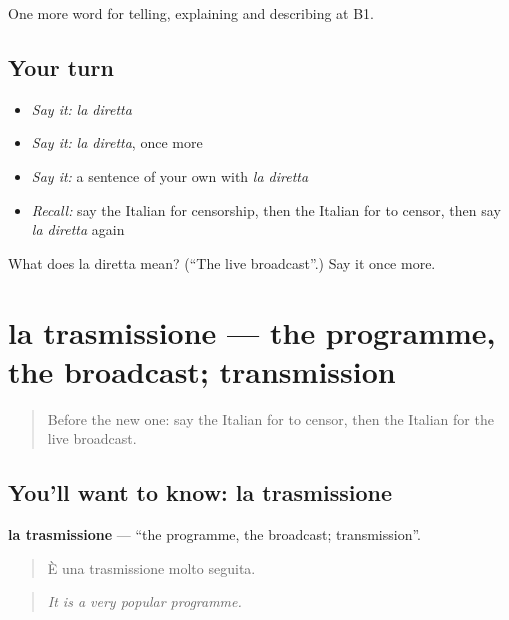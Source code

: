 \begin{grammarlens}[title={What you've built}]
One more word for telling, explaining and describing at B1.
\end{grammarlens}

\subsection*{Your turn}
\begin{itemize}
\raggedright
  \item \emph{Say it:} \emph{la diretta}
  \item \emph{Say it:} \emph{la diretta}, once more
  \item \emph{Say it:} a sentence of your own with \emph{la diretta}
  \item \emph{Recall:} say the Italian for censorship, then the Italian for to censor, then say \emph{la diretta} again
\end{itemize}

\begin{tcolorbox}[breakable,colback=teal!4,colframe=teal!35!black,title={Before you move on}]
What does la diretta mean? (\textquotedblleft{}The live broadcast\textquotedblright{}.) Say it once more.
\end{tcolorbox}
\section[la trasmissione]{la trasmissione — the programme, the broadcast; transmission}

\label{lesson:IT-C287-trasmissione}



\begin{quote}
Before the new one: say the Italian for to censor, then the Italian for the live broadcast.
\end{quote}

\subsection*{You'll want to know: la trasmissione}
\textbf{la trasmissione} — \textquotedblleft{}the programme, the broadcast; transmission\textquotedblright{}.

\begin{quote}
È una trasmissione molto seguita.
\end{quote}

\begin{quote}
\emph{It is a very popular programme.}
\end{quote}

